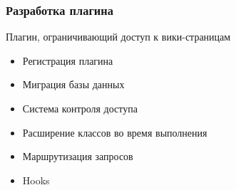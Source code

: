 \documentclass[unicode]{beamer}
\begin{document}

\begin{frame}
\transwipe[direction=90]
\frametitle{Разработка плагина}
\begin{block}{Плагин, ограничивающий доступ к вики-страницам}
\begin{itemize}
  \item Регистрация плагина
  \item Миграция базы данных
  \item Система контроля доступа
  \item Расширение классов во время выполнения
  \item Маршрутизация запросов
  \item Hooks
\end{itemize}
\end{block}
\end{frame}
\end{document}

